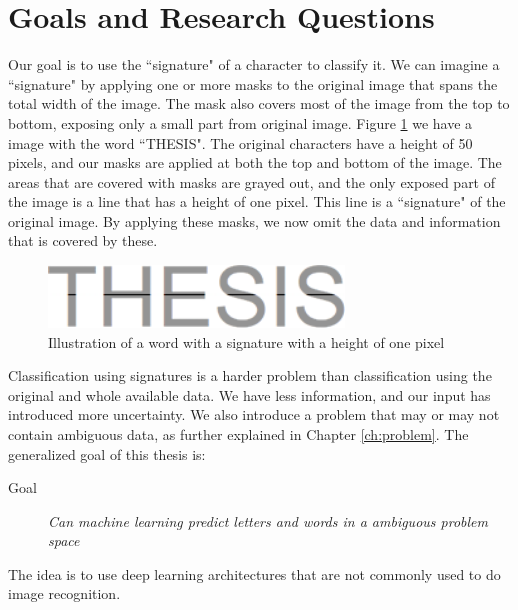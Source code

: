 \section{Goals and Research Questions}
\label{sec:goals_and_research_questions}
Our goal is to use the ``signature" of a character to classify it. We can imagine a ``signature" by applying one or more masks to the original image that spans the total width of the image. The mask also covers most of the image from the top to bottom, exposing only a small part from original image. Figure \ref{fig:thesis-signature} we have a image with the word ``THESIS". The original characters have a height of 50 pixels, and our masks are applied at both the top and bottom of the image. The areas that are covered with masks are grayed out, and the only exposed part of the image is a line that has a height of one pixel. This line is a ``signature" of the original image. By applying these masks, we now omit the data and information that is covered by these.

\begin{figure}[ht]
    \centering
    \includegraphics[width=0.7\textwidth]{fig/chapter1/signature.png}
    \caption{Illustration of a word with a signature with a height of one pixel}
    \label{fig:thesis-signature}
\end{figure}

Classification using signatures is a harder problem than classification using the original and whole available data. We have less information, and our input has introduced more uncertainty. We also introduce a problem that may or may not contain ambiguous data, as further explained in Chapter \ref{ch:problem}. The generalized goal of this thesis is:

\begin{description}
\item[Goal] {\textit{Can machine learning predict letters and words in a ambiguous problem space}}
\end{description}

The idea is to use deep learning architectures that are not commonly used to do image recognition. 




